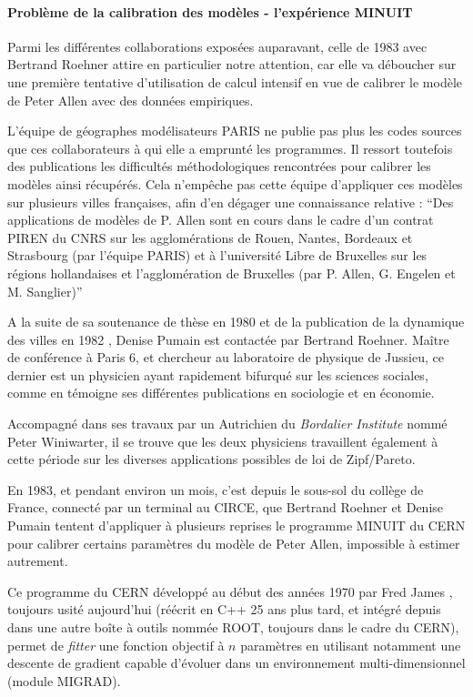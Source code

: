 \paragraph{Problème de la calibration des modèles - l'expérience MINUIT}
\label{p:experience_minuit}

Parmi les différentes collaborations exposées auparavant, celle de 1983 avec Bertrand Roehner attire en particulier notre attention, car elle va déboucher sur une première tentative d’utilisation de calcul intensif en vue de calibrer le modèle de Peter Allen avec des données empiriques.

L'équipe de géographes modélisateurs PARIS ne publie pas plus les codes sources que ces collaborateurs à qui elle a emprunté les programmes. Il ressort toutefois des publications les difficultés méthodologiques rencontrées pour calibrer les modèles ainsi récupérés. Cela n'empêche pas cette équipe d'appliquer ces modèles sur plusieurs villes françaises, afin d'en dégager une connaissance relative \autocite[134]{Pumain1984} : \enquote{Des applications de modèles de P. Allen sont en cours dans le cadre d'un contrat PIREN du CNRS sur les agglomérations de Rouen, Nantes, Bordeaux et Strasbourg (par l'équipe PARIS) et à l'université Libre de Bruxelles sur les régions hollandaises et l'agglomération de Bruxelles (par P. Allen, G. Engelen et M. Sanglier)}

A la suite de sa soutenance de thèse en 1980 et de la publication de la dynamique des villes en 1982 \autocite{Pumain1982}, Denise Pumain est contactée par Bertrand Roehner. Maître de conférence à Paris 6, et chercheur au laboratoire de physique de Jussieu, ce dernier est un physicien ayant rapidement bifurqué sur les sciences sociales, comme en témoigne ses différentes publications en sociologie et en économie.

Accompagné dans ses travaux par un Autrichien du \textit{Bordalier Institute} nommé Peter Winiwarter, il se trouve que les deux physiciens travaillent également à cette période sur les diverses applications possibles de loi de Zipf/Pareto.

En 1983, et pendant environ un mois, c’est depuis le sous-sol du collège de France, connecté par un terminal au CIRCE, que Bertrand Roehner et Denise Pumain tentent d’appliquer à plusieurs reprises le programme MINUIT du CERN pour calibrer certains paramètres du modèle de Peter Allen, impossible à estimer autrement.

Ce programme du CERN développé au début des années 1970 par Fred James \autocite{James1972}, toujours usité aujourd’hui (réécrit en C++ 25 ans plus tard, et intégré depuis dans une autre boîte à outils nommée ROOT, toujours dans le cadre du CERN), permet de \textit{fitter} une fonction objectif à $n$ paramètres en utilisant notamment une descente de gradient capable d’évoluer dans un environnement multi-dimensionnel (module MIGRAD).

